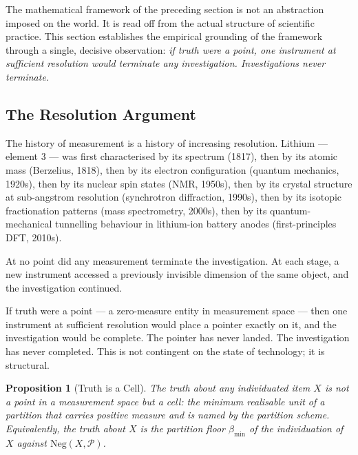 \documentclass[12pt,a4paper,twocolumn]{article}
\theoremstyle{plain}
\newtheorem{proposition}[theorem]{Proposition}
\theoremstyle{definition}
\theoremstyle{remark}
\newcommand{\Part}{\mathcal{P}}
\newcommand{\bmin}{\beta_{\min}}
\newcommand{\Neg}{\mathrm{Neg}}
\begin{document}
The mathematical framework of the preceding section is not an abstraction
imposed on the world.  It is read off from the actual structure of scientific
practice.  This section establishes the empirical grounding of the framework
through a single, decisive observation: \emph{if truth were a point, one
instrument at sufficient resolution would terminate any investigation.
Investigations never terminate.}

\subsection{The Resolution Argument}

The history of measurement is a history of increasing resolution.
Lithium --- element 3 --- was first characterised by its spectrum (1817),
then by its atomic mass (Berzelius, 1818), then by its electron configuration
(quantum mechanics, 1920s), then by its nuclear spin states (NMR, 1950s),
then by its crystal structure at sub-angstrom resolution (synchrotron
diffraction, 1990s), then by its isotopic fractionation patterns (mass
spectrometry, 2000s), then by its quantum-mechanical tunnelling behaviour
in lithium-ion battery anodes (first-principles DFT, 2010s).

At no point did any measurement terminate the investigation.  At each stage,
a new instrument accessed a previously invisible dimension of the same object,
and the investigation continued.

If truth were a point --- a zero-measure entity in measurement space --- then
one instrument at sufficient resolution would place a pointer exactly on it,
and the investigation would be complete.  The pointer has never landed.  The
investigation has never completed.  This is not contingent on the state of
technology; it is structural.

\begin{proposition}[Truth is a Cell]
\label{prop:truth-cell}
The \emph{truth} about any individuated item $X$ is not a point in a
measurement space but a \emph{cell}: the minimum realisable unit of a
partition that carries positive measure and is named by the partition scheme.
Equivalently, the truth about $X$ is the partition floor $\bmin$ of the
individuation of $X$ against $\Neg(X, \Part)$.
\end{proposition}
\end{document}
